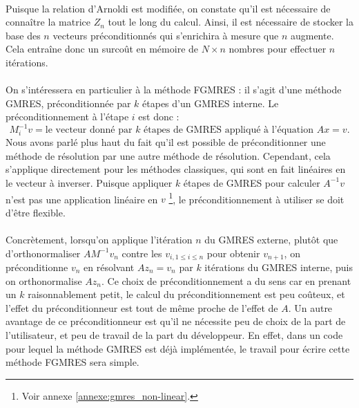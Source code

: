     \paragraph{}
    Puisque la relation d'Arnoldi est modifiée, on constate qu'il est nécessaire de connaître la matrice $Z_n$ tout le long du calcul.
    Ainsi, il est nécessaire de stocker la base des $n$ vecteurs préconditionnés qui s'enrichira à mesure que $n$ augmente.
    Cela entraîne donc un surcoût en mémoire de $N \times n$ nombres pour effectuer $n$ itérations.

    \paragraph{}
    On s'intéressera en particulier à la méthode FGMRES \cite{Saad1993, SimonciniSzyld2002} : il s'agit d'une méthode GMRES, préconditionnée par $k$ étapes d'un GMRES interne.
    Le préconditionnement à l'étape $i$ est donc :
    \[M_i^{-1}v = \textrm{le vecteur donné par $k$ étapes de GMRES appliqué à l'équation $Ax = v$.}\]
    Nous avons parlé plus haut du fait qu'il est possible de préconditionner une méthode de résolution par une autre méthode de résolution.
    Cependant, cela s'applique directement pour les méthodes classiques, qui sont en fait linéaires en le vecteur à inverser.
    Puisque appliquer $k$ étapes de GMRES pour calculer $A^{-1}v$ n'est pas une application linéaire en $v$ \footnote{Voir annexe \ref{annexe:gmres_non-linear}.}, le préconditionnement à utiliser se doit d'être flexible.

    \paragraph{}
    Concrètement, lorsqu'on applique l'itération $n$ du GMRES externe, plutôt que d'orthonormaliser $AM^{-1}v_n$ contre les $v_{i, 1\leq i\leq n}$ pour obtenir $v_{n+1}$, on préconditionne $v_n$ en résolvant $Az_n = v_n$ par $k$ itérations du GMRES interne, puis on orthonormalise $Az_n$.
    Ce choix de préconditionnement a du sens car en prenant un $k$ raisonnablement petit, le calcul du préconditionnement est peu coûteux, et l'effet du préconditionneur est tout de même proche de l'effet de $A$.
    Un autre avantage de ce préconditionneur est qu'il ne nécessite peu de choix de la part de l'utilisateur, et peu de travail de la part du développeur.
    En effet, dans un code pour lequel la méthode GMRES est déjà implémentée, le travail pour écrire cette méthode FGMRES sera simple.

